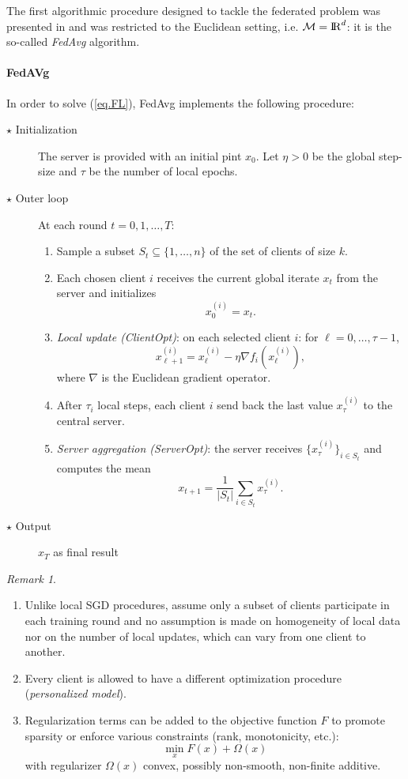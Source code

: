\documentclass[10pt,a4paper]{book}
\theoremstyle{definition}
\theoremstyle{plain}
\theoremstyle{remark}
\newtheorem{rmk}{Remark}[section]
\newcommand \M {\mathcal{M}}
\def\R{{\rm I\kern-0.16em R}}
\begin{document}
The first algorithmic procedure designed to tackle the federated problem was presented in \cite{mcmahan2017communication} and was restricted to the Euclidean setting, i.e. $\M=\R^d$: it is the so-called \emph{FedAvg} algorithm.
\paragraph{FedAVg}
In order to solve (\ref{eq.FL}), FedAvg implements the following procedure:
\begin{description}
\item[$\star$ Initialization] The server is provided with an initial pint $x_0$.
Let $\eta>0$ be the global step-size and $\tau$ be the number of local epochs. 
\item[$\star$ Outer loop] At each round $t=0,1,\dots, T$:
\begin{enumerate}
\item Sample a subset $S_t \subseteq \{1,\dots,n\}$ of the set of clients of size $k$.
\item Each chosen client $i$ receives the current global iterate $x_t$ from the server and initializes
$$x_0^{(i)}=x_t.$$
\item \textit{Local update (ClientOpt)}: on each selected client $i$: for $\ell=0,\dots, \tau-1$,
$$x_{\ell+1}^{(i)}=x_{\ell}^{(i)}-\eta \nabla f_i(x_{\ell}^{(i)}),$$
where $\nabla$ is the Euclidean gradient operator.
\item After $\tau_i$ local steps, each client $i$ send back the last value $x_{\tau}^{(i)}$ to the central server.
\item \textit{Server aggregation (ServerOpt)}: the server receives $\{x_{\tau}^{(i)}\}_{i\in S_t}$ and computes the mean
$$x_{t+1}=\frac{1}{|S_t|}\sum_{i\in S_t}x_{\tau}^{(i)}.$$
\end{enumerate}
\item[$\star$ Output]  $x_T$ as final result 
\end{description}

\begin{rmk}~
\begin{enumerate}
\item Unlike local SGD procedures,  assume only a subset of clients participate in each training round and no assumption is made on homogeneity of local data nor on the number of local updates, which can vary from one client to another.
\item Every client is allowed to have a different optimization procedure  (\emph{personalized model}).
\item Regularization terms can be added to the objective function $F$ to promote sparsity or enforce various constraints (rank, monotonicity, etc.):
$$\min_x F(x)+\Omega(x)$$
with regularizer $\Omega(x)$ convex, possibly non-smooth, non-finite additive.
\end{enumerate}
\end{rmk}
\end{document}
